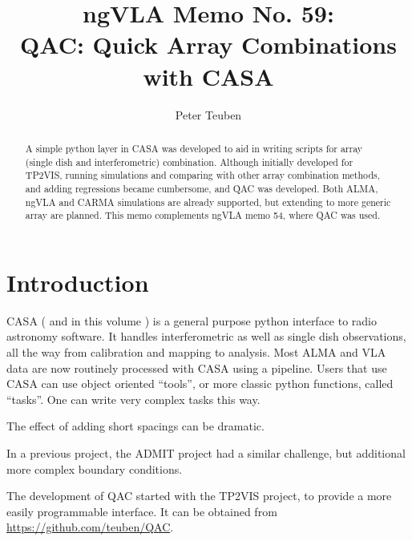 \documentclass[11pt,twoside]{article}
\begin{document}
\title{ngVLA Memo No. 59: \\ QAC: Quick Array Combinations with CASA}
\author{Peter Teuben}



\begin{abstract}

A simple python layer in CASA was developed to aid in writing scripts
for array (single dish and interferometric) combination. Although
initially developed for TP2VIS, running simulations and comparing with
other array combination methods, and adding regressions became
cumbersome, and QAC was developed. Both ALMA, ngVLA and CARMA
simulations are already supported, but extending to more generic array
are planned. This memo complements ngVLA memo 54, where QAC was used.

\end{abstract}




\section{Introduction}

CASA (\citet{casa1} and in this volume \citet{casa2}) 
is a general purpose python interface to radio
astronomy software. It handles interferometric as well as single dish
observations, all the way from calibration and mapping to
analysis. Most ALMA and VLA data are now routinely processed with CASA
using a pipeline.  Users that use CASA can use object oriented
``tools'', or more classic python functions, called
``tasks''. One can write very complex tasks this way.

The effect of adding short spacings can be dramatic.

In a previous project, the ADMIT project had a similar challenge, but
additional more complex boundary conditions.

The development of QAC started with the TP2VIS project, to provide a
more easily programmable interface. It can be obtained from
\url{https://github.com/teuben/QAC}.
\end{document}

